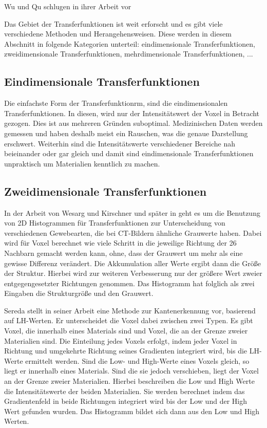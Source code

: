 Wu und Qu schlugen in ihrer Arbeit vor \cite{wu2007interactive}


Das Gebiet der Transferfunktionen ist weit erforscht und es gibt viele verschiedene Methoden und Herangehensweisen. Diese werden in diesem Abschnitt in folgende Kategorien unterteil: eindimensionale Transferfunktionen, zweidimensionale Transferfunktionen, mehrdimensionale Transferfunktionen, ...


\subsection{Eindimensionale Transferfunktionen}

Die einfachste Form der Transferfunktionrm, sind die eindimensionalen Transferfunktionen. In diesen, wird nur der Intensitätswert der Voxel in Betracht gezogen. Dies ist aus mehreren Gründen suboptimal. Medizinischen Daten werden gemessen und haben deshalb meist ein Rauschen, was die genaue Darstellung erschwert. Weiterhin sind die Intensitätswerte verschiedener Bereiche nah beieinander oder gar gleich und damit sind eindimensionale Transferfunktionen unpraktisch um Materialien kenntlich zu machen.
\subsection{Zweidimensionale Transferfunktionen}



In der Arbeit von Wesarg und Kirschner \cite{wesarg2009structure} und später in \cite{wesarg20102d} geht es um die Benutzung von 2D Histogrammen für Transferfunktionen zur Unterscheidung von verschiedenen Gewebearten, die bei CT-Bildern ähnliche Grauwerte haben.
Dabei wird für Voxel berechnet wie viele Schritt in die jeweilige Richtung der 26 Nachbarn gemacht werden kann, ohne, dass der Grauwert um mehr als eine gewisse Differenz verändert. Die Akkumulation aller Werte ergibt dann die Größe der Struktur. Hierbei wird zur weiteren Verbesserung nur der größere Wert zweier entgegengesetzter Richtungen genommen.
Das Histogramm hat folglich als zwei Eingaben die Strukturgröße und den Grauwert.


Sereda stellt in seiner Arbeit \cite{sereda2006visualization} eine Methode zur Kantenerkennung vor, basierend auf LH-Werten. Er unterscheidet die Voxel dabei zwischen zwei Typen. Es gibt Voxel, die  innerhalb eines Materials sind und Voxel, die  an der Grenze zweier Materialien sind. Die Einteilung jedes Voxels erfolgt, indem jeder Voxel in Richtung und umgekehrte Richtung seines Gradienten integriert wird, bis die LH-Werte ermittelt werden. Sind die Low- und High-Werte eines Voxels gleich, so liegt er innerhalb eines Materials. Sind  die sie jedoch verschieben, liegt der Voxel an der Grenze zweier Materialien. Hierbei beschreiben die Low und High Werte die Intensitätswerte der beiden Materialien. Sie werden berechnet indem das Gradientenfeld in beide Richtungen integriert wird bis der Low und der High Wert gefunden wurden. Das Histogramm bildet sich dann aus den Low und High Werten.

